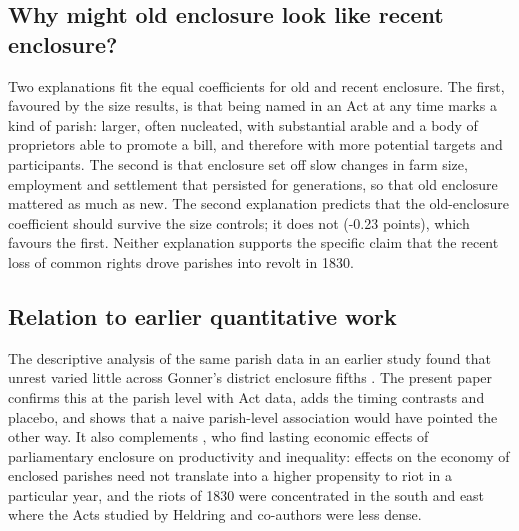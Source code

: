 \documentclass[11pt,a4paper]{article}
\begin{document}
\subsection{Why might old enclosure look like recent enclosure?}
Two explanations fit the equal coefficients for old and recent enclosure. The first, favoured by the size results, is that being named in an Act at any time marks a kind of parish: larger, often nucleated, with substantial arable and a body of proprietors able to promote a bill, and therefore with more potential targets and participants. The second is that enclosure set off slow changes in farm size, employment and settlement that persisted for generations, so that old enclosure mattered as much as new. The second explanation predicts that the old-enclosure coefficient should survive the size controls; it does not (-0.23 points), which favours the first. Neither explanation supports the specific claim that the recent loss of common rights drove parishes into revolt in 1830.

\subsection{Relation to earlier quantitative work}
The descriptive analysis of the same parish data in an earlier study found that unrest varied little across Gonner's district enclosure fifths \citep{hotham2026swing}. The present paper confirms this at the parish level with Act data, adds the timing contrasts and placebo, and shows that a naive parish-level association would have pointed the other way. It also complements \citet{heldring2022}, who find lasting economic effects of parliamentary enclosure on productivity and inequality: effects on the economy of enclosed parishes need not translate into a higher propensity to riot in a particular year, and the riots of 1830 were concentrated in the south and east where the Acts studied by Heldring and co-authors were less dense.
\end{document}
